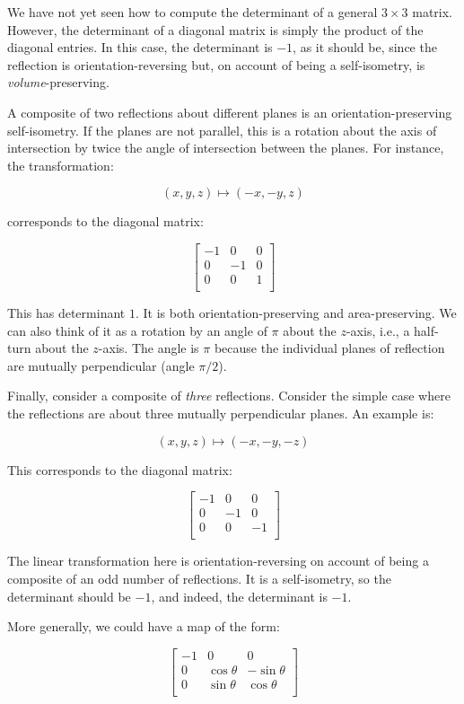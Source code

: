\documentclass[10pt]{amsart}
\begin{document}
We have not yet seen how to compute the determinant of a general $3
\times 3$ matrix. However, the determinant of a diagonal matrix is
simply the product of the diagonal entries. In this case, the
determinant is $-1$, as it should be, since the reflection is
orientation-reversing but, on account of being a self-isometry, is
{\em volume}-preserving.

A composite of two reflections about different planes is an
orientation-preserving self-isometry. If the planes are not parallel,
this is a rotation about the axis of intersection by twice the angle
of intersection between the planes. For instance, the transformation:

$$(x,y,z) \mapsto (-x,-y,z)$$

corresponds to the diagonal matrix:

$$\left[\begin{matrix} -1 & 0 & 0 \\ 0 & -1 & 0 \\ 0 & 0 & 1 \\\end{matrix}\right]$$

This has determinant $1$. It is both orientation-preserving and
area-preserving. We can also think of it as a rotation by an angle of
$\pi$ about the $z$-axis, i.e., a half-turn about the $z$-axis. The
angle is $\pi$ because the individual planes of reflection are
mutually perpendicular (angle $\pi/2$).

Finally, consider a composite of {\em three} reflections. Consider the
simple case where the reflections are about three mutually
perpendicular planes. An example is:

$$(x,y,z) \mapsto (-x,-y,-z)$$

This corresponds to the diagonal matrix:

$$\left[\begin{matrix} -1 & 0 & 0 \\ 0 & -1 & 0 \\ 0 & 0 & -1 \\\end{matrix}\right]$$

The linear transformation here is orientation-reversing on account of
being a composite of an odd number of reflections. It is a
self-isometry, so the determinant should be $-1$, and indeed, the
determinant is $-1$.

More generally, we could have a map of the form:

$$\left[\begin{matrix} -1 & 0 & 0 \\ 0 & \cos \theta & -\sin \theta \\ 0 & \sin \theta & \cos \theta \\\end{matrix}\right]$$
\end{document}
